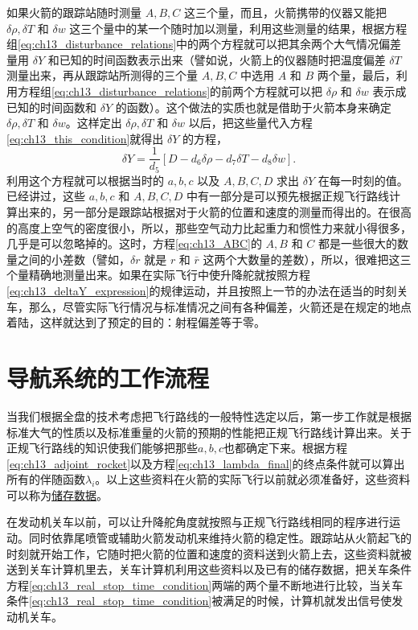 如果火箭的跟踪站随时测量 $A, B, C$ 这三个量，而且，火箭携带的仪器又能把 $\delta \rho, \delta T$ 和 $\delta w$ 这三个量中的某一个随时加以测量，利用这些测量的结果，根据方程组\eqref{eq:ch13_disturbance_relations}中的两个方程就可以把其余两个大气情况偏差量用 $\delta Y$ 和已知的时间函数表示出来（譬如说，火箭上的仪器随时把温度偏差 $\delta T$ 测量出来，再从跟踪站所测得的三个量 $A, B, C$ 中选用 $A$ 和 $B$ 两个量，最后，利用方程组\eqref{eq:ch13_disturbance_relations}的前两个方程就可以把 $\delta \rho$ 和 $\delta w$ 表示成已知的时间函数和 $\delta Y$ 的函数）。这个做法的实质也就是借助于火箭本身来确定 $\delta \rho, \delta T$ 和 $\delta w$。这样定出 $\delta \rho, \delta T$ 和 $\delta w$ 以后，把这些量代入方程\eqref{eq:ch13_this_condition}就得出 $\delta Y$ 的方程，
\begin{equation}\label{eq:ch13_deltaY_expression}
\delta Y = \frac{1}{d_5} [D - d_6 \delta \rho - d_7 \delta T - d_8 \delta w].
\end{equation}
利用这个方程就可以根据当时的 $a, b, c$ 以及 $A, B, C, D$ 求出 $\delta Y$ 在每一时刻的值。已经讲过，这些 $a, b, c$ 和 $A, B, C, D$ 中有一部分是可以预先根据正规飞行路线计算出来的，另一部分是跟踪站根据对于火箭的位置和速度的测量而得出的。在很高的高度上空气的密度很小，所以，那些空气动力比起重力和惯性力来就小得很多，几乎是可以忽略掉的。这时，方程\eqref{eq:ch13_ABC}的 $A, B$ 和 $C$ 都是一些很大的数量之间的小差数（譬如，$\delta r$ 就是 $r$ 和 $\bar{r}$ 这两个大数量的差数），所以，很难把这三个量精确地测量出来。如果在实际飞行中使升降舵就按照方程\eqref{eq:ch13_deltaY_expression}的规律运动，并且按照上一节的办法在适当的时刻关车，那么，尽管实际飞行情况与标准情况之间有各种偏差，火箭还是在规定的地点着陆，这样就达到了预定的目的：射程偏差等于零。

\section{导航系统的工作流程}

当我们根据全盘的技术考虑把飞行路线的一般特性选定以后，第一步工作就是根据标准大气的性质以及标准重量的火箭的预期的性能把正规飞行路线计算出来。关于正规飞行路线的知识使我们能够把那些$a, b, c$也都确定下来。根据方程\eqref{eq:ch13_adjoint_rocket}以及方程\eqref{eq:ch13_lambda_final}的终点条件就可以算出所有的伴随函数$\lambda_i$。以上这些资料在火箭的实际飞行以前就必须准备好，这些资料可以称为\underline{储存数据}。

在发动机关车以前，可以让升降舵角度就按照与正规飞行路线相同的程序进行运动。同时依靠尾喷管或辅助火箭发动机来维持火箭的稳定性。跟踪站从火箭起飞的时刻就开始工作，它随时把火箭的位置和速度的资料送到火箭上去，这些资料就被送到关车计算机里去，关车计算机利用这些资料以及已有的储存数据，把关车条件方程\eqref{eq:ch13_real_stop_time_condition}两端的两个量不断地进行比较，当关车条件\eqref{eq:ch13_real_stop_time_condition}被满足的时候，计算机就发出信号使发动机关车。

